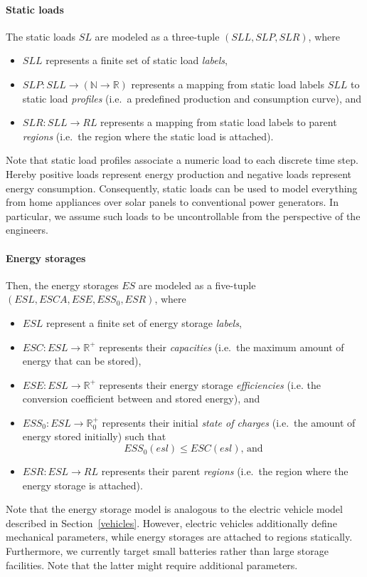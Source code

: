 \paragraph{Static loads}
\label{static_loads}

The static loads $SL$ are modeled as a three-tuple $(SLL, SLP, SLR)$, where
\begin{itemize}
	\item $SLL$ represents a finite set of static load \textit{labels},
	\item $SLP: SLL \rightarrow (\mathbb{N} \rightarrow \mathbb{R})$ represents a mapping from static load labels $SLL$ to static load \textit{profiles} (i.e.\ a predefined production and consumption curve), and
	\item $SLR: SLL \rightarrow RL$ represents a mapping from static load labels to parent \textit{regions} (i.e.\ the region where the static load is attached).
\end{itemize}
Note that static load profiles associate a numeric load to each discrete time step. Hereby positive loads represent energy production and negative loads represent energy consumption. Consequently, static loads can be used to model everything from home appliances over solar panels to conventional power generators. In particular, we assume such loads to be uncontrollable from the perspective of the engineers.

\paragraph{Energy storages}
\label{energy_storages}

Then, the energy storages $ES$ are modeled as a five-tuple $(ESL, ESCA, ESE, ESS_0, ESR)$, where
\begin{itemize}
	\item $ESL$ represent a finite set of energy storage \textit{labels},
	\item $ESC: ESL \rightarrow \mathbb{R}^+$ represents their \textit{capacities} (i.e.\ the maximum amount of energy that can be stored),
	\item $ESE: ESL \rightarrow \mathbb{R}^+$ represents their energy storage \textit{efficiencies} (i.e. the conversion coefficient between  and stored energy), and
	\item $ESS_0: ESL \rightarrow \mathbb{R}_0^+$ represents their initial \textit{state of charges} (i.e.\ the amount of energy stored initially) such that
	\[
		ESS_0(esl) \leq ESC(esl) \textrm{, and}
	\]
	\item $ESR: ESL \rightarrow RL$ represents their parent \textit{regions} (i.e.\ the region where the energy storage is attached).
\end{itemize}
Note that the energy storage model is analogous to the electric vehicle model described in Section~\ref{vehicles}. However, electric vehicles additionally define mechanical parameters, while energy storages are attached to regions statically. Furthermore, we currently target small batteries rather than large storage facilities. Note that the latter might require additional parameters. 

